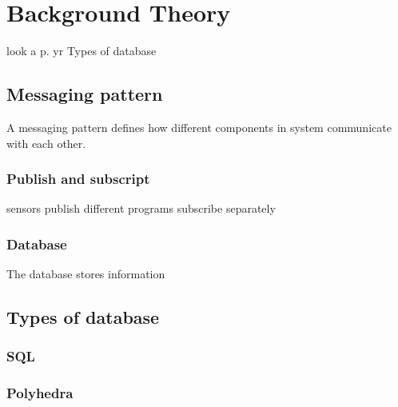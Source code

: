 \section{Background Theory}

look a p. yr
Types of database

\subsection{Messaging pattern}
A messaging pattern defines how different components in system communicate with each other.

	\subsubsection{Publish and subscript}
	sensors publish
    different programs subscribe separately
    
    \subsubsection{Database}
    The database stores information 

\subsection{Types of database}

  \subsubsection{SQL}

  \subsubsection{Polyhedra}
